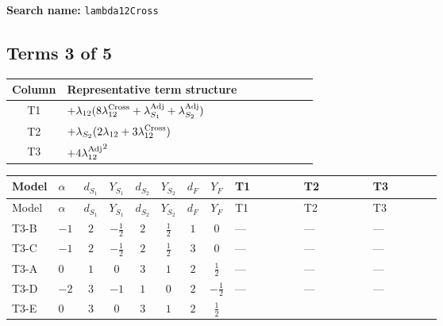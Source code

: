 \documentclass[8pt]{article}
\begin{document}
\begin{landscape}
\begin{longtable}{@{}llcccccc >{\raggedright\arraybackslash}p{0.21\linewidth} >{\raggedright\arraybackslash}p{0.21\linewidth} >{\raggedright\arraybackslash}p{0.21\linewidth}@{}}
\midrule
\bottomrule
\end{longtable}
\clearpage
\noindent\textbf{Search name: }\texttt{lambda12Cross}\par\smallskip
\subsection*{Terms 3 of 5}
\begin{center}
\begin{tabular}{@{}c >{\raggedright\arraybackslash}p{0.82\linewidth}@{}}
\toprule
Column & Representative term structure \\
\midrule
T1 & \(\displaystyle +{\lambda_{12}} (8 {\lambda_{12}^{\rm Cross}}+{\lambda_{S_1}^{\rm Adj}}+{\lambda_{S_2}^{\rm Adj}})\) \\
\midrule
T2 & \(\displaystyle +{\lambda_{S_2}} (2 {\lambda_{12}}+3 {\lambda_{12}^{\rm Cross}})\) \\
\midrule
T3 & \(\displaystyle +4 {\lambda_{12}^{\rm Adj}}^2\) \\
\midrule
\bottomrule
\end{tabular}
\end{center}
\smallskip
\tiny
\begin{longtable}{@{}llcccccc >{\raggedright\arraybackslash}p{0.21\linewidth} >{\raggedright\arraybackslash}p{0.21\linewidth} >{\raggedright\arraybackslash}p{0.21\linewidth}@{}}
\toprule
Model & $\alpha$ & $d_{S_1}$ & $Y_{S_1}$ & $d_{S_2}$ & $Y_{S_2}$ & $d_F$ & $Y_F$ & T1 & T2 & T3 \\
\midrule
\endfirsthead
\toprule
Model & $\alpha$ & $d_{S_1}$ & $Y_{S_1}$ & $d_{S_2}$ & $Y_{S_2}$ & $d_F$ & $Y_F$ & T1 & T2 & T3 \\
\midrule
\endhead
T3-B & $-1$ & $2$ & $-\frac{1}{2}$ & $2$ & $\frac{1}{2}$ & $1$ & $0$ & --- & --- & --- \\
\midrule
T3-C & $-1$ & $2$ & $-\frac{1}{2}$ & $2$ & $\frac{1}{2}$ & $3$ & $0$ & --- & --- & --- \\
\midrule
T3-A & $0$ & $1$ & $0$ & $3$ & $1$ & $2$ & $\frac{1}{2}$ & --- & --- & --- \\
\midrule
T3-D & $-2$ & $3$ & $-1$ & $1$ & $0$ & $2$ & $-\frac{1}{2}$ & --- & --- & --- \\
\midrule
T3-E & $0$ & $3$ & $0$ & $3$ & $1$ & $2$ & $\frac{1}{2}$ & \scriptsize\adjustbox{max width=\linewidth}{$\begin{gathered} +{\lambda_{12}} (8 {\lambda_{12}^{\rm Cross}}+{\lambda_{S_1}^{\rm Adj}}+{\lambda_{S_2}^{\rm Adj}})\end{gathered}$} & \scriptsize\adjustbox{max width=\linewidth}{$\begin{gathered} +{\lambda_{S_2}} (2 {\lambda_{12}}+3 {\lambda_{12}^{\rm Cross}})\end{gathered}$} & \scriptsize\adjustbox{max width=\linewidth}{$\begin{gathered} +4 {\lambda_{12}^{\rm Adj}}^2\end{gathered}$} \\

\end{longtable}
\end{landscape}
\end{document}
